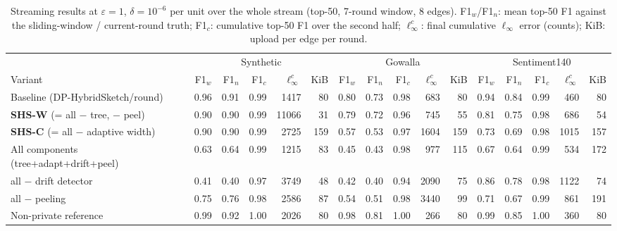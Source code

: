 \begin{table}[t]\centering\footnotesize
\caption{Streaming results at $\varepsilon=1$, $\delta=10^{-6}$ per unit over the whole stream (top-50, 7-round window, 8 edges). F1$_w$/F1$_n$: mean top-50 F1 against the sliding-window / current-round truth; F1$_c$: cumulative top-50 F1 over the second half; $\ell_\infty^c$: final cumulative $\ell_\infty$ error (counts); KiB: upload per edge per round.}\label{tab:main}
\setlength{\tabcolsep}{3.2pt}\begin{tabular}{lrrrrrrrrrrrrrrr}\toprule
 & \multicolumn{5}{c}{Synthetic} & \multicolumn{5}{c}{Gowalla} & \multicolumn{5}{c}{Sentiment140}\\
\cmidrule(lr){2-6} \cmidrule(lr){7-11} \cmidrule(lr){12-16}
Variant & F1$_w$ & F1$_n$ & F1$_c$ & $\ell_\infty^c$ & KiB & F1$_w$ & F1$_n$ & F1$_c$ & $\ell_\infty^c$ & KiB & F1$_w$ & F1$_n$ & F1$_c$ & $\ell_\infty^c$ & KiB\\\midrule
Baseline (DP-HybridSketch/round) & 0.96 & 0.91 & 0.99 & 1417 & 80 & 0.80 & 0.73 & 0.98 & 683 & 80 & 0.94 & 0.84 & 0.99 & 460 & 80\\
\textbf{SHS-W} (= all $-$ tree, $-$ peel) & 0.90 & 0.90 & 0.99 & 11066 & 31 & 0.79 & 0.72 & 0.96 & 745 & 55 & 0.81 & 0.75 & 0.98 & 686 & 54\\
\textbf{SHS-C} (= all $-$ adaptive width) & 0.90 & 0.90 & 0.99 & 2725 & 159 & 0.57 & 0.53 & 0.97 & 1604 & 159 & 0.73 & 0.69 & 0.98 & 1015 & 157\\
All components (tree+adapt+drift+peel) & 0.63 & 0.64 & 0.99 & 1215 & 83 & 0.45 & 0.43 & 0.98 & 977 & 115 & 0.67 & 0.64 & 0.99 & 534 & 172\\
\quad all $-$ drift detector & 0.41 & 0.40 & 0.97 & 3749 & 48 & 0.42 & 0.40 & 0.94 & 2090 & 75 & 0.86 & 0.78 & 0.98 & 1122 & 74\\
\quad all $-$ peeling & 0.75 & 0.76 & 0.98 & 2586 & 87 & 0.54 & 0.51 & 0.98 & 3440 & 99 & 0.71 & 0.67 & 0.99 & 861 & 191\\
\midrule
Non-private reference & 0.99 & 0.92 & 1.00 & 2026 & 80 & 0.98 & 0.81 & 1.00 & 266 & 80 & 0.99 & 0.85 & 1.00 & 360 & 80\\
\bottomrule\end{tabular}\end{table}